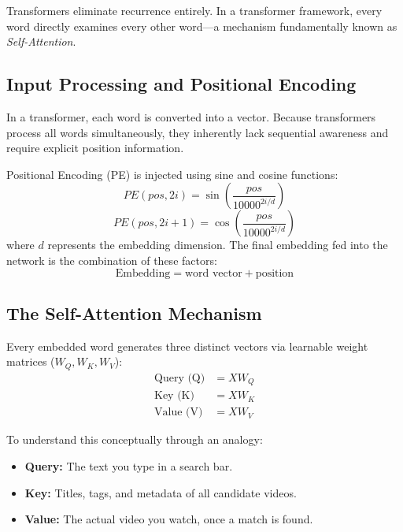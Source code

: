 \documentclass[10pt, conference]{IEEEtran}
\begin{document}
Transformers eliminate recurrence entirely. In a transformer framework, every word directly examines every other word—a mechanism fundamentally known as \textit{Self-Attention}.

\subsection{\textbf{Input Processing and Positional Encoding}}
In a transformer, each word is converted into a vector. Because transformers process all words simultaneously, they inherently lack sequential awareness and require explicit position information. 

Positional Encoding (PE) is injected using sine and cosine functions:
\begin{equation}
    PE(pos, 2i) = \sin\left(\frac{pos}{10000^{2i/d}}\right)
\end{equation}
\begin{equation}
    PE(pos, 2i+1) = \cos\left(\frac{pos}{10000^{2i/d}}\right)
\end{equation}
where $d$ represents the embedding dimension. The final embedding fed into the network is the combination of these factors:
\begin{equation}
    \text{Embedding} = \text{word vector} + \text{position}
\end{equation}

\subsection{\textbf{The Self-Attention Mechanism}}
Every embedded word generates three distinct vectors via learnable weight matrices ($W_Q, W_K, W_V$):
\begin{align}
    \text{Query (Q)} &= X W_Q \\
    \text{Key (K)} &= X W_K \\
    \text{Value (V)} &= X W_V
\end{align}

To understand this conceptually through an analogy:
\begin{itemize}
    \item \textbf{Query:} The text you type in a search bar.
    \item \textbf{Key:} Titles, tags, and metadata of all candidate videos.
    \item \textbf{Value:} The actual video you watch, once a match is found.
\end{itemize}
\end{document}
